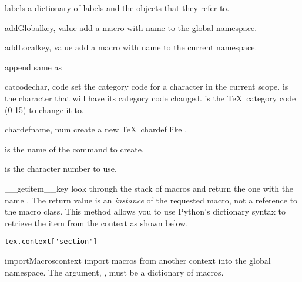 \begin{memberdesc}[Context]{labels}
a dictionary of labels and the objects that they refer to.
\end{memberdesc}



\begin{methoddesc}[Context]{addGlobal}{key, value}
add a macro  with name  to the global namespace. 
\end{methoddesc}

\begin{methoddesc}[Context]{addLocal}{key, value}
add a macro  with name  to the current namespace. 
\end{methoddesc}

\begin{methoddesc}[Context]{append}{}
same as 
\end{methoddesc}

\begin{methoddesc}[Context]{catcode}{char, code}
set the category code for a character in the current scope.  
is the character that will have its category code changed.  
is the \TeX\ category code (0-15) to change it to.
\end{methoddesc}

\begin{methoddesc}[Context]{chardef}{name, num}
create a new \TeX\ chardef like .

 is the name of the command to create.

 is the character number to use.
\end{methoddesc}

\begin{methoddesc}[Context]{__getitem__}{key}
look through the stack of macros and return the one with the name .
The return value is an \emph{instance} of the requested macro,
not a reference to the macro class.
This method allows you to use Python's dictionary syntax to retrieve
the item from the context as shown below.
\begin{verbatim}
tex.context['section']
\end{verbatim}
\end{methoddesc}

\begin{methoddesc}[Context]{importMacros}{context}
import macros from another context into the global namespace.  The argument,
, must be a dictionary of macros.
\end{methoddesc}

